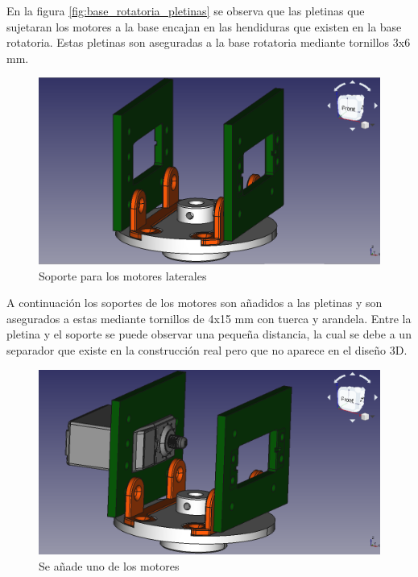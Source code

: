 En la figura \ref{fig:base_rotatoria_pletinas} se observa que las pletinas que sujetaran los motores a la base encajan en las hendiduras que existen en la base rotatoria. Estas pletinas son aseguradas a la base rotatoria mediante tornillos 3x6 mm.

\begin{figure}[H]
    \centering 
    \includegraphics[width=1\linewidth]{pictures/BaseRotatoriaConPletinasYSoporte.png}
    \caption{Soporte para los motores laterales}
    \label{fig:soporte_motores_laterales}
\end{figure}

A continuación los soportes de los motores son añadidos a las pletinas y son asegurados a estas mediante tornillos de 4x15 mm con tuerca y arandela.
Entre la pletina y el soporte se puede observar una pequeña distancia, la cual se debe a un separador que existe en la construcción real pero que no aparece en el diseño 3D.

\begin{figure}[H]
    \centering 
    \includegraphics[width=1\linewidth]{pictures/BaseRotatoriaConUnMotor.png}
    \caption{Se añade uno de los motores}
    \label{fig:un_motor_añadido}
\end{figure}


